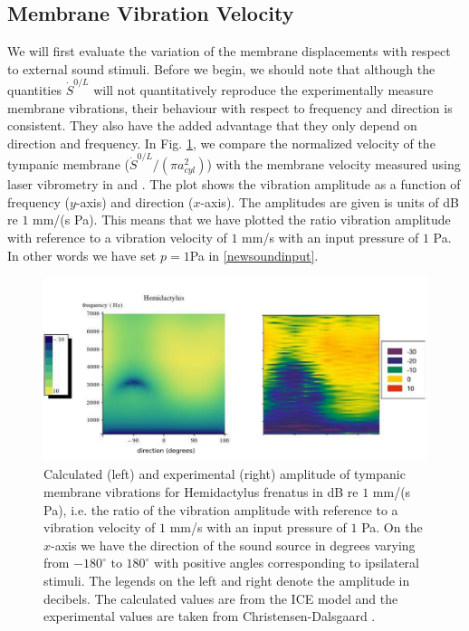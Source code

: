 \subsection{Membrane Vibration Velocity}\label{vibvelocity}
We will first evaluate the variation of the membrane displacements with respect to external 
sound stimuli. Before we begin, we should note that although the quantities
$\dot{S}^{0/L}$ will not quantitatively reproduce the experimentally measure membrane vibrations, their behaviour with respect to
frequency and direction is consistent. They also have the added advantage that they only depend on direction and frequency. In Fig. \ref{hemidactylusvibampfull},
we compare the normalized velocity of the tympanic membrane ($\dot{S}^{0/L}/(\pi a^2_{cyl})$) with the membrane velocity measured using laser vibrometry
in \cite{dalsgaardmanley1} and \cite{dalsgaardmanley2}. The plot shows the vibration amplitude as a function of frequency ($y$-axis) and direction ($x$-axis). The amplitudes are given
is units of dB re $1$ mm/(s Pa). This means that we have plotted the ratio vibration amplitude with reference to a vibration velocity of $1$ mm/s with an input pressure of $1$ Pa.
In other words we have set $p=1$Pa in \eqref{newsoundinput}.
\begin{figure}[ht!]
 \centering
 \includegraphics[width=1.0\linewidth]{Diagrams/Plots/hemidactylusvibampfull.png}
 \caption[Vibration amplitude for the common house gecko]{Calculated (left) and experimental (right) amplitude of tympanic membrane vibrations for Hemidactylus frenatus
 in dB re $1$ mm/(s Pa), i.e. the ratio of the vibration amplitude with reference to a vibration velocity of $1$ mm/s with an input pressure of $1$ Pa. On the $x$-axis we have
 the direction of the sound source in degrees varying from $-180^\circ\mbox{ to }180^\circ$ with positive angles corresponding to ipsilateral stimuli. The legends on the left and
 right denote the amplitude in decibels. The calculated values are from the ICE model and the experimental values are taken from Christensen-Dalsgaard \cite{dalsgaardmanley2}.}
  \label{hemidactylusvibampfull}
\end{figure}

